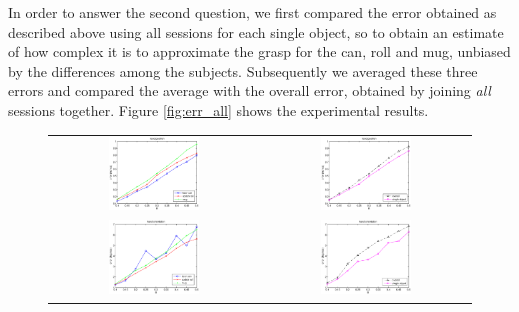 In order to answer the second question, we first compared the error
obtained as described above using all sessions for each single object,
so to obtain an estimate of how complex it is to approximate the grasp
for the can, roll and mug, unbiased by the differences among the
subjects. Subsequently we averaged these three errors and compared the
average with the overall error, obtained by joining \emph{all}
sessions together. Figure \ref{fig:err_all} shows the experimental
results.

\begin{figure}[htbp]
  \begin{center}
    \begin{tabular}{cc}
      \includegraphics[width=0.45\textwidth]{error_pos.eps} &
      \includegraphics[width=0.45\textwidth]{error_cmp_pos.eps} \\
      \includegraphics[width=0.45\textwidth]{error_ori.eps} &
      \includegraphics[width=0.45\textwidth]{error_cmp_ori.eps} \\

\end{tabular}
\end{center}
\end{figure}
